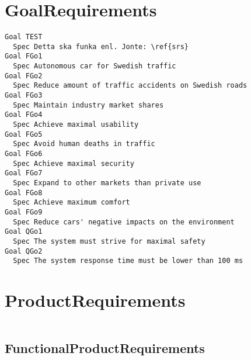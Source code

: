 \begin{lstlisting}

\end{lstlisting}


       \section{GoalRequirements}


\begin{lstlisting}
Goal TEST
  Spec Detta ska funka enl. Jonte: \ref{srs}
Goal FGo1
  Spec Autonomous car for Swedish traffic
Goal FGo2
  Spec Reduce amount of traffic accidents on Swedish roads
Goal FGo3
  Spec Maintain industry market shares
Goal FGo4
  Spec Achieve maximal usability
Goal FGo5
  Spec Avoid human deaths in traffic
Goal FGo6
  Spec Achieve maximal security
Goal FGo7
  Spec Expand to other markets than private use
Goal FGo8
  Spec Achieve maximum comfort
Goal FGo9
  Spec Reduce cars' negative impacts on the environment
Goal QGo1
  Spec The system must strive for maximal safety
Goal QGo2
  Spec The system response time must be lower than 100 ms

\end{lstlisting}
    
        
       \section{ProductRequirements}


\begin{lstlisting}

\end{lstlisting}


       \subsection{FunctionalProductRequirements}


